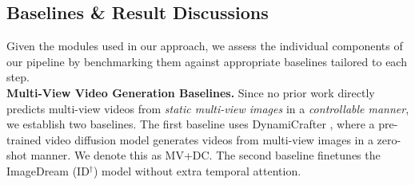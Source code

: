 \subsection{Baselines \& Result Discussions}
Given the modules used in our approach, we assess the individual components of our pipeline by benchmarking them against appropriate baselines tailored to each step. 
\\
\noindent\textbf{Multi-View Video Generation Baselines.} Since no prior work directly predicts multi-view videos from \emph{static multi-view images} in a {\em controllable manner}, we establish two baselines. The first baseline uses DynamiCrafter \cite{xing2024dynamicrafter}, where a pre-trained video diffusion model generates videos from multi-view images in a zero-shot manner. We denote this as MV+DC. The second baseline finetunes the ImageDream (ID$^{\dagger}$) \cite{wang2023imagedream} model without extra temporal attention.
